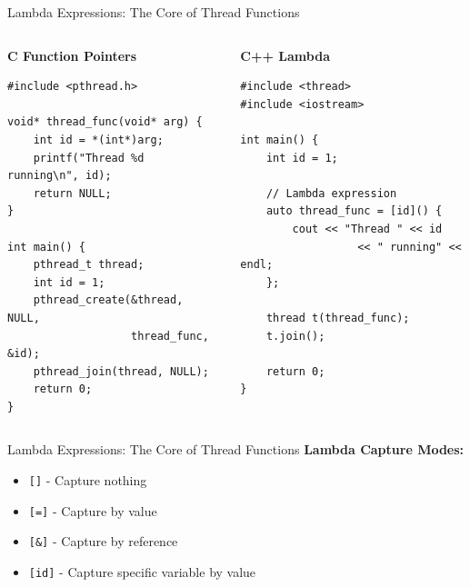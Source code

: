 \begin{frame}[fragile]{Lambda Expressions: The Core of Thread Functions}
	\begin{columns}
		\begin{column}{0.5\textwidth}
			\textbf{C Function Pointers}
			\begin{verbatim}
#include <pthread.h>

void* thread_func(void* arg) {
    int id = *(int*)arg;
    printf("Thread %d running\n", id);
    return NULL;
}

int main() {
    pthread_t thread;
    int id = 1;
    pthread_create(&thread, NULL,
                   thread_func, &id);
    pthread_join(thread, NULL);
    return 0;
}
			\end{verbatim}
		\end{column}
		\begin{column}{0.5\textwidth}
			\textbf{C++ Lambda}
			\begin{verbatim}
#include <thread>
#include <iostream>

int main() {
    int id = 1;

    // Lambda expression
    auto thread_func = [id]() {
        cout << "Thread " << id
                  << " running" << endl;
    };

    thread t(thread_func);
    t.join();

    return 0;
}
			\end{verbatim}
		\end{column}
	\end{columns}

\end{frame}

\begin{frame}[fragile]{Lambda Expressions: The Core of Thread Functions}
	\textbf{Lambda Capture Modes:}
	\begin{itemize}
		\item \texttt{[]} - Capture nothing
		\item \texttt{[=]} - Capture by value
		\item \texttt{[\&]} - Capture by reference
		\item \texttt{[id]} - Capture specific variable by value
	\end{itemize}
\end{frame}

